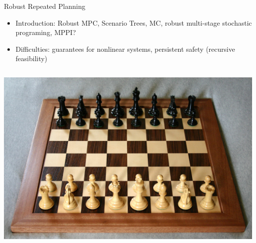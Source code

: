 \documentclass[lecture]{beamer}
\begin{document}
\begin{frame}{\normalsize Robust Repeated Planning}
\footnotesize
\begin{itemize}
\item Introduction: Robust MPC, Scenario Trees, MC, robust multi-stage stochastic programing, MPPI?
\item Difficulties: guarantees for nonlinear systems, persistent safety (recursive feasibility)
\end{itemize}

\begin{columns}[t]


\includegraphics[width=1\textwidth,clip]{Figures/Chess.pdf}
\end{columns}

\end{frame}
\end{document}
